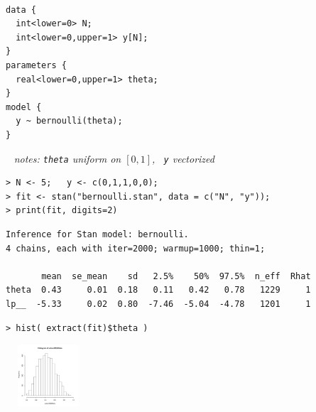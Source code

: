 \documentclass[10pt]{report}
\newcommand{\sld}[1]{\newpage{\noindent\LARGE \ \ \
    \textcolor{MidnightBlue}{\bfseries #1}}\vspace*{4pt}}
\newcommand{\spc}{\hspace*{0.25in}}
\newcommand{\mypart}[2]{{\newpage 
\mbox{ }
\vfill
\noindent\spc\color{MidnightBlue}{\LARGE\bfseries #1\\[10pt]\spc\Huge{#2}}
\vfill\vfill}
\mbox{ }}
\begin{document}
\mypart{Part I}{Stan Front End}


\sld{Example: \ Bernoulli}
\vfill
\spc\spc
\begin{minipage}[t]{0.8\textwidth}
\begin{Verbatim}
data {
  int<lower=0> N;
  int<lower=0,upper=1> y[N];
}
parameters {
  real<lower=0,upper=1> theta;
} 
model {
  y ~ bernoulli(theta);
}
\end{Verbatim}
\end{minipage}
\vfill
\vfill
\vfill
\mbox{ } \hfill {\small\slshape notes: {\tt theta} uniform on $[0,1]$, \ {\tt y} vectorized}
\vfill


\sld{RStan Execution}

\begin{minipage}[t]{\textwidth}
\footnotesize
\begin{Verbatim}
> N <- 5;   y <- c(0,1,1,0,0);
> fit <- stan("bernoulli.stan", data = c("N", "y"));
> print(fit, digits=2)
\end{Verbatim}
\vspace*{1pt}
\begin{Verbatim}[fontshape=sl]
Inference for Stan model: bernoulli.
4 chains, each with iter=2000; warmup=1000; thin=1; 

       mean  se_mean    sd   2.5%    50%  97.5%  n_eff  Rhat
theta  0.43     0.01  0.18   0.11   0.42   0.78   1229     1
lp__  -5.33     0.02  0.80  -7.46  -5.04  -4.78   1201     1
\end{Verbatim}
\vspace*{6pt}
\begin{Verbatim}
> hist( extract(fit)$theta )
\end{Verbatim}
\vspace*{-24pt}
\hfill\includegraphics[width=1.25in,height=0.9in]{img/bernoulli-posterior-histo.pdf}
\hspace*{24pt}
\end{minipage}

\sld{Basic Program Blocks}
\end{document}
